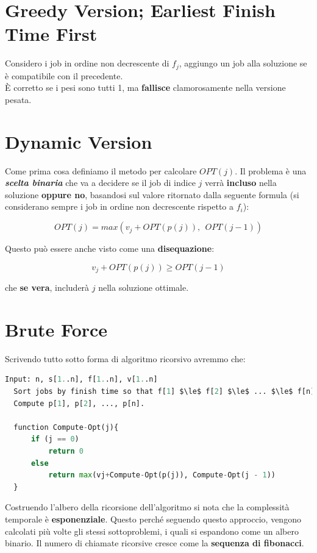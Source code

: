 \section{Greedy Version; Earliest Finish Time First}

Considero i job in ordine non decrescente di $f_j$, aggiungo un job
alla soluzione se è compatibile con il precedente.\\
È corretto se i pesi sono tutti 1, ma \textbf{fallisce} clamorosamente
nella versione pesata.

\section{Dynamic Version}

Come prima cosa definiamo il metodo per calcolare $OPT(j)$. Il
problema è una \textbf{\emph{scelta binaria}} che va a decidere se il
job di indice $j$ verrà \textbf{incluso} nella soluzione
\textbf{oppure no}, basandosi sul valore ritornato dalla seguente
formula (si considerano sempre i job in ordine non decrescente rispetto
a $f_i$):

$$
      OPT(j) = max(v_j + OPT(p(j)), \ \ OPT(j-1))
$$

Questo può essere anche visto come una \textbf{disequazione}:

$$
      v_j + OPT(p(j)) \geq OPT(j-1)
$$

che \textbf{se vera}, includerà $j$ nella soluzione ottimale.


\section{Brute Force}

Scrivendo tutto sotto forma di algoritmo ricorsivo avremmo che:

\begin{lstlisting}[language=Python, mathescape=true]
  Input: n, s[1..n], f[1..n], v[1..n]
  Sort jobs by finish time so that f[1] $\le$ f[2] $\le$ ... $\le$ f[n]. 
  Compute p[1], p[2], ..., p[n].
  
  function Compute-Opt(j){
      if (j == 0)
          return 0
      else
          return max(vj+Compute-Opt(p(j)), Compute-Opt(j - 1))
  }
\end{lstlisting}

Costruendo l'albero della ricorsione dell'algoritmo si nota che la
complessità temporale è \textbf{esponenziale}. Questo perché seguendo
questo approccio, vengono calcolati più volte gli stessi sottoproblemi,
i quali si espandono come un albero binario. Il numero di chiamate
ricorsive cresce come la \textbf{sequenza di fibonacci}.

